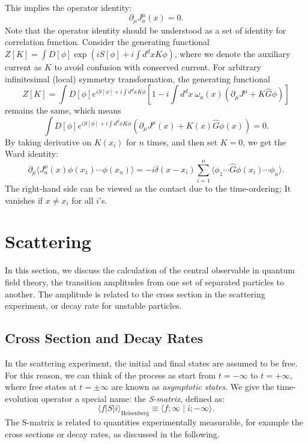 \documentclass[aps,prb,superscriptaddress,nofootinbib]{revtex4}
\begin{document}
This implies the operator identity:
\begin{equation}
	\partial_\mu J_a^\mu(x) = 0.
\end{equation}
Note that the operator identity should be understood as a set of identity for correlation function.
Consider the generating functional $Z[K] =\int D[\phi] \exp(iS[\phi]+ i \int d^d x K \phi)$, where we denote the auxiliary current as $K$ to avoid confusion with conserved current.
For arbitrary infinitesimal (local) symmetry transformation, the generating functional
\begin{equation}
	Z[K] = \int D[\phi] e^{iS[\phi]+ i \int d^d x K \phi} \left[1-i\int d^d x\ \omega_a(x)\left(\partial_\mu J^\mu + K \hat G \phi \right) \right]
\end{equation}
remains the same, which means
\begin{equation}
	\int D[\phi] e^{iS[\phi]+ i \int d^d x K \phi} \left(\partial_\mu J^\mu(x) + K(x) \hat G \phi(x) \right) = 0.
\end{equation}
By taking derivative on $K(x_i)$ for $n$ times, and then set $K=0$, we get the Ward identity:
\begin{equation}
	\partial_\mu \langle J_a^\mu(x) \phi(x_1) \cdots \phi(x_n)\rangle = -i\delta(x-x_i) \sum_{i=1}^n \langle \phi_1 \cdots \hat G\phi(x_i)\cdots \phi_n\rangle.
\end{equation}
The right-hand side can be viewed as the contact due to the time-ordering;
It vanishes if $x \ne x_i$ for all $i$'s. 




\section{Scattering}

In this section, we discuss the calculation of the central observable in quantum field theory, the transition amplitudes from one set of separated particles to another.
The amplitude is related to the cross section in the scattering experiment, or decay rate for unstable particles.


\subsection{Cross Section and Decay Rates}

In the scattering experiment, the initial and final states are assumed to be free.
For this reason, we can think of the process as start from $t=-\infty$ to $t=+\infty$, where free states at $t=\pm \infty$ are known as \textit{asymptotic states}.
We give the time-evolution operator a special name: the \textit{S-matrix}, defined as:
\begin{equation}
	\langle f|S| i\rangle_{\text{Heisenberg}} \equiv \langle f ; \infty \mid i ;-\infty\rangle.
\end{equation}
The S-matrix is related to quantities experimentally measurable, for example the cross sections or decay rates, as discussed in the following.
\end{document}

